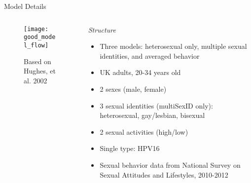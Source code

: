 \documentclass[aspectratio=169]{beamer}
\begin{document}
\begin{frame}{Model Details}
    \begin{columns}[T]
    \begin{column}{0.5\textwidth}
        \centering
        \begin{figure}
            \texttt{[image: good\_model\_flow]}
            \caption{\scriptsize{Based on Hughes, et al. 2002}}
        \end{figure}
    \end{column}
    \begin{column}{0.5\textwidth}
    \pause
    \emph{Structure}
    \begin{itemize}
        \pause
        \item Three models: heterosexual only, multiple sexual identities, and averaged behavior
        \pause
        \item UK adults, 20-34 years old
        \pause
        \item 2 sexes (male, female)
        \pause
        \item 3 sexual identities (multiSexID only): heterosexual, gay/lesbian, bisexual
        \pause 
        \item 2 sexual activities (high/low)
        \pause
        \item Single type: HPV16
        \pause
        \item Sexual behavior data from National Survey on Sexual Attitudes and Lifestyles, 2010-2012
    \end{itemize}
    \end{column}
    \end{columns}
\end{frame}
\end{document}
